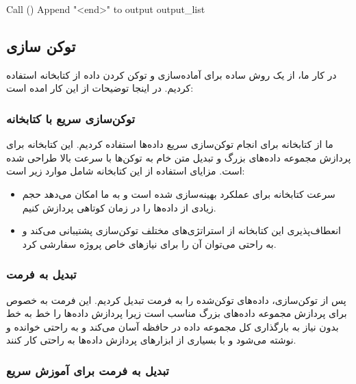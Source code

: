 \begin{LTR}
\begin{algorithm}
\begin{algorithmic}[1]
                  \State Call ()
                  \State Append "<end>" to output
                  \State \Return output\_list
                  \EndFunction
            \end{algorithmic}
      \end{algorithm}
\end{LTR}

\subsection{توکن سازی}

در کار ما، از یک روش ساده برای آماده‌سازی و توکن کردن داده از
کتابخانه  \cite{Moi_HuggingFace_s_Tokenizers_2023} استفاده کردیم. در اینجا توضیحات از این کار
امده است:

\subsubsection{توکن‌سازی سریع با کتابخانه }

ما از کتابخانه  برای انجام توکن‌سازی سریع داده‌ها
استفاده کردیم. این کتابخانه برای پردازش مجموعه داده‌های بزرگ و تبدیل متن
خام به توکن‌ها با سرعت بالا طراحی شده است. مزایای استفاده از این
کتابخانه شامل موارد زیر است:
\begin{itemize}
      \item{سرعت}
            کتابخانه  برای عملکرد بهینه‌سازی شده است و به ما
            امکان می‌دهد حجم زیادی از داده‌ها را در زمان کوتاهی پردازش کنیم.
      \item{انعطاف‌پذیری}
            این کتابخانه از استراتژی‌های مختلف توکن‌سازی پشتیبانی می‌کند
            و به راحتی می‌توان آن را برای نیازهای خاص پروژه سفارشی کرد.
\end{itemize}


\subsubsection{تبدیل به فرمت }

پس از توکن‌سازی، داده‌های توکن‌شده را به فرمت  تبدیل کردیم. این فرمت به خصوص برای پردازش مجموعه داده‌های بزرگ مناسب است زیرا پردازش داده‌ها را خط به خط بدون نیاز به بارگذاری کل مجموعه داده در حافظه آسان می‌کند و به راحتی خوانده و نوشته می‌شود و با بسیاری از ابزارهای پردازش داده‌ها به راحتی کار کنند.

\subsubsection{تبدیل به فرمت  برای آموزش سریع}

